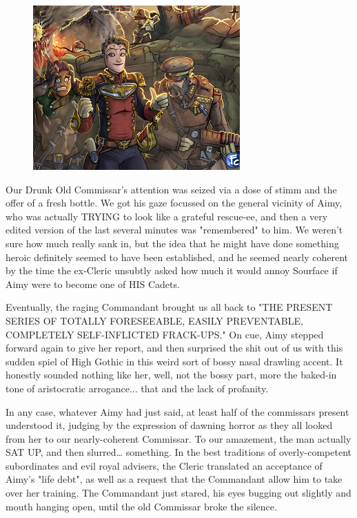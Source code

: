 \begin{figure}
	\begin{center}
		\includegraphics[width=\figwidth]{pics/21/57.png}
	\end{center}
\end{figure}
Our Drunk Old Commissar's attention was seized via a dose of stimm and the offer of a fresh bottle. 
We got his gaze focussed on the general vicinity of Aimy, who was actually TRYING to look like a grateful rescue-ee, and then a very edited version of the last several minutes was "remembered" to him. 
We weren't sure how much really sank in, but the idea that he might have done something heroic definitely seemed to have been established, and he seemed nearly coherent by the time the ex-Cleric unsubtly asked how much it would annoy Sourface if Aimy were to become one of HIS Cadets. 


Eventually, the raging Commandant brought us all back to "THE PRESENT SERIES OF TOTALLY FORESEEABLE, EASILY PREVENTABLE, COMPLETELY SELF-INFLICTED FRACK-UPS." On cue, Aimy stepped forward again to give her report, and then surprised the shit out of us with this sudden spiel of High Gothic in this weird sort of bossy nasal drawling accent. 
It honestly sounded nothing like her, well, not the bossy part, more the baked-in tone of aristocratic arrogance... 
that and the lack of profanity. 


In any case, whatever Aimy had just said, at least half of the commissars present understood it, judging by the expression of dawning horror as they all looked from her to our nearly-coherent Commissar. 
To our amazement, the man actually SAT UP, and then slurred… something. 
In the best traditions of overly-competent subordinates and evil royal advisers, the Cleric translated an acceptance of Aimy's "life debt", as well as a request that the Commandant allow him to take over her training. 
The Commandant just stared, his eyes bugging out slightly and mouth hanging open, until the old Commissar broke the silence.

